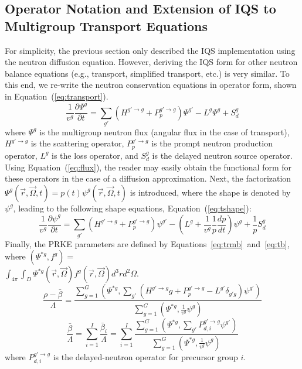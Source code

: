 \documentclass[12pt]{scrartcl}
\newcommand{\eqt}[1]{Equation~(\ref{#1})}                     %
\newcommand{\be}{\begin{equation}}
\newcommand{\ee}{\end{equation}}
\begin{document}
\subsection{Operator Notation and Extension of IQS to Multigroup Transport Equations}
\label{sect:transport}

For simplicity, the previous section only described the IQS implementation using the neutron diffusion equation. However, deriving the IQS form for other neutron balance equations (e.g., transport, simplified transport, etc.) is very similar. To this end, we re-write the neutron conservation equations in operator form, shown in \eqt{eq:transport}. 
\be
\frac{1}{v^g}\frac{\partial \Psi^g}{\partial t} = \sum_{g'} \left(H^{g'\to g} + P_p^{g' \to g} \right) \Psi^{g'} - L^g\Psi^g + S_d^g
\label{eq:transport}
\ee
where $\Psi^g$ is the multigroup neutron flux (angular flux in the case of transport), $H^{g'\to g}$ is the scattering operator, $P_p^{g' \to g}$ is the prompt neutron production operator, $L^g$ is the loss operator, and $S_d^g$ is the delayed neutron source operator. Using \eqt{eq:flux}, the reader may easily obtain the functional form for these operators in the case of a diffusion approximation.
%
Next, the factorization $\Psi^g(\vec{r},\vec{\Omega},t)=p(t)\psi^g(\vec{r},\vec{\Omega},t)$ is introduced, where the shape is denoted by $\psi^g$, leading to the following shape equations, \eqt{eq:tshape}:
\be
\frac{1}{v^g}\frac{\partial \psi^g}{\partial t} = \sum_{g'} \left(H^{g' \to g} + P_p^{g' \to g}\right) \psi^{g'} - \left( L^g + \frac{1}{v^g}\frac{1}{p}\frac{dp}{dt}\right) \psi^g + \frac{1}{p} S_d^g
\label{eq:tshape}
\ee
Finally, the PRKE parameters are defined by Equations~\ref{eq:trmb}~and~\ref{eq:tb}, where 
$\left(\Psi^{*g},f^g\right) =$\\ $ \int_{4\pi}\int_D \Psi^{*g}(\vec{r},\vec{\Omega})f^g(\vec{r},\vec{\Omega})d^3r d^2\Omega$.
\be
\frac{\rho-\bar{\beta}}{\Lambda}=\frac{ \sum_{g=1}^G\left(\Psi^{*g},\sum_{g'}(H^{g' \to g}g+P_p^{g' \to g}-L^{g'}\delta_{g'g})\psi^{g'}\right)}{\sum_{g=1}^G\left(\Psi^{*g},\frac{1}{v^g}\psi^g\right)}
\label{eq:trmb}
\ee
\be
\frac{\bar{\beta}}{\Lambda}=\sum_{i=1}^I\frac{\bar{\beta}_i}{\Lambda}=\sum_{i=1}^I\frac{\sum_{g=1}^G(\Psi^{*g}, \sum_{g'} P_{d,i}^{g' \to g} \psi^{g'})}{\sum_{g=1}^G\left(\Psi^{*g},\frac{1}{v^g}\psi^g\right)}
\label{eq:tb}
\ee
where $P_{d,i}^{g' \to g}$ is the delayed-neutron operator for precursor group $i$.
\end{document}
